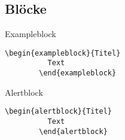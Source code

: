   \subsection{Blöcke}
  \begin{frame}[fragile]{\subsecname}

    \begin{exampleblock}{Exampleblock}
      \begin{lstlisting}[gobble=8]
        \begin{exampleblock}{Titel}
          Text
        \end{exampleblock}
      \end{lstlisting}
    \end{exampleblock}

    \begin{alertblock}{Alertblock}
      \begin{lstlisting}[gobble=8]
        \begin{alertblock}{Titel}
          Text
        \end{alertblock}
      \end{lstlisting}
    \end{alertblock}

  \end{frame}

